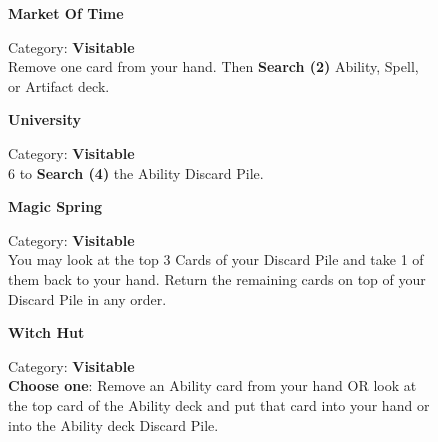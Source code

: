\begin{figure}[H]
  \begin{minipage}[t]{0.47\textwidth}
    \vspace{0pt}
    \centering
    \phantom{j}\textbf{Market Of Time}\par
    \caption{\small Category: \textbf{Visitable}\\ Remove one card from your hand.
Then \textbf{Search (2)} Ability, Spell, or Artifact deck.}
  \end{minipage}\hfill
  \begin{minipage}[t]{0.47\textwidth}
    \vspace{0pt}
    \centering
    \textbf{University}\par
    \caption{\small Category: \textbf{Visitable}\\
       6  to \textbf{Search (4)} the Ability Discard Pile.}
  \end{minipage}
\end{figure}

\begin{figure}[H]
  \begin{minipage}[t]{0.47\textwidth}
    \vspace{0pt}
    \centering
    \textbf{Magic Spring}\par
    \caption{\small Category: \textbf{Visitable}\\
      You may look at the top 3 Cards of your Discard Pile and take 1 of them back to your hand.
      Return the remaining cards on top of your Discard Pile in any order.}
  \end{minipage}\hfill
  \begin{minipage}[t]{0.47\textwidth}
    \vspace{0pt}
    \centering
    \phantom{j}\textbf{Witch Hut}\par
    \caption{\small Category: \textbf{Visitable}\\
      \textbf{Choose one}: Remove an Ability card from your hand OR look at the top card of the Ability deck and put that card into your hand or into the Ability deck Discard Pile.}
  \end{minipage}
\end{figure}

